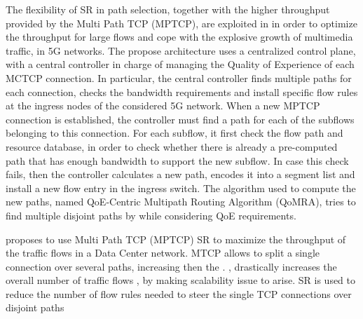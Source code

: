 The flexibility of SR in path selection, together with the higher throughput provided by the Multi Path TCP (MPTCP), are exploited in \cite{barakabitze2018novel} in order to optimize the throughput for large flows and cope with the explosive growth of multimedia traffic, in 5G networks.
The propose architecture uses a centralized control plane, with a central controller in charge of managing the Quality of Experience of each MCTCP connection.
In particular, the central controller finds multiple paths for each connection, checks the bandwidth requirements and install specific flow rules at the ingress nodes of the considered 5G network.
When a new MPTCP connection is established, the controller must find a path for each of the subflows belonging to this connection.
For each subflow, it first check the flow path and resource database, in order to check whether there is already a pre-computed path that has enough bandwidth to support the new subflow.
In case this check fails, then the controller calculates a new path, encodes it into a segment list and install a new flow entry in the ingress switch.
The algorithm used to compute the new paths, named QoE-Centric Multipath Routing Algorithm (QoMRA), tries to find multiple disjoint paths by while considering QoE requirements.

\cite{pang2017sdn} proposes to use Multi Path TCP (MPTCP)   SR to maximize the throughput of the traffic flows in a Data Center network. MTCP allows to split a single connection over several paths, increasing then the .  ,   drastically increases the overall number of  traffic flows , by making scalability issue to arise. SR is used to reduce the number of flow rules needed to steer the single TCP connections over disjoint paths  

